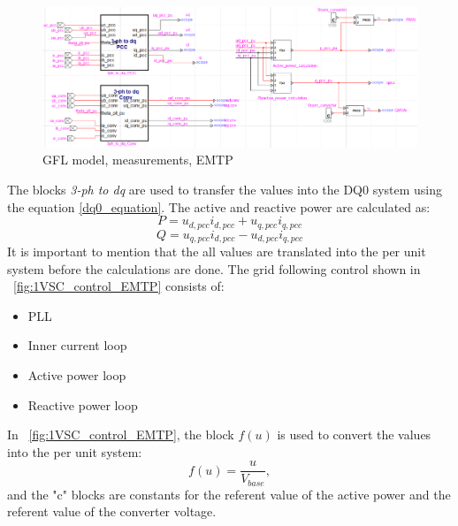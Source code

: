 \documentclass{report}
\begin{document}
\begin{figure}[H]
    \centering
    \includegraphics[scale = 0.35]{Figure_1VSC/1VSC_model_measurements.png}
    \caption{GFL model, measurements, EMTP}
    \label{fig:1-VSC-model_measurements}
\end{figure}
The blocks \textit{3-ph to dq} are used to transfer the values into the DQ0 system using the equation \eqref{dq0_equation}. 
The active and reactive power are calculated as:
\begin{equation}
    P = u_{d,pcc}i_{d,pcc} + u_{q,pcc}i_{q,pcc}
\end{equation}
\begin{equation}
    Q = u_{q,pcc}i_{d,pcc} - u_{d,pcc}i_{q,pcc}
\end{equation}
It is important to mention that the all values are translated into the per unit system before the calculations are done. The grid following control shown in \figurename~\ref{fig:1VSC_control_EMTP} consists of:
\begin{itemize}
    \item PLL
    \item Inner current loop
    \item Active power loop
    \item Reactive power loop
\end{itemize}
In \figurename~\ref{fig:1VSC_control_EMTP}, the block $f(u)$ is used to convert the values into the per unit system:
\begin{equation}
f(u) = \frac{u}{V_{base}},    
\end{equation}
and the "c" blocks are constants for the referent value of the active power and the referent value of the converter voltage.
\end{document}
